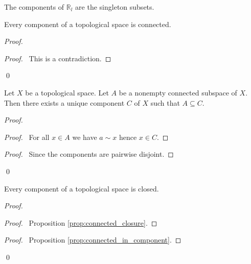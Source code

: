 \begin{ex}
The components of $\mathbb{R}_l$ are the singleton subsets.
\end{ex}

\begin{prop}
\label{prop:component_connected}
Every component of a topological space is connected.
\end{prop}

\begin{proof}
\pf
{}
\qedstep
\begin{proof}
	\pf\ This is a contradiction.
\end{proof}
\qed
\end{proof}

\begin{prop}
\label{prop:connected_in_component}
Let $X$ be a topological space. Let $A$ be a nonempty connected subspace of $X$. Then there exists a unique component $C$ of $X$ such that $A \subseteq C$.
\end{prop}

\begin{proof}
\pf
{}
\begin{proof}
	\pf\ For all $x \in A$ we have $a \sim x$ hence $x \in C$.
\end{proof}
\begin{proof}
	\pf\ Since the components are pairwise disjoint.
\end{proof}
\qed
\end{proof}

\begin{prop}
Every component of a topological space is closed.
\end{prop}

\begin{proof}
\pf
{}
\begin{proof}
	\pf\ Proposition \ref{prop:connected_closure}.
\end{proof}
\begin{proof}
	\pf\ Proposition \ref{prop:connected_in_component}.
\end{proof}
\qed
\end{proof}

